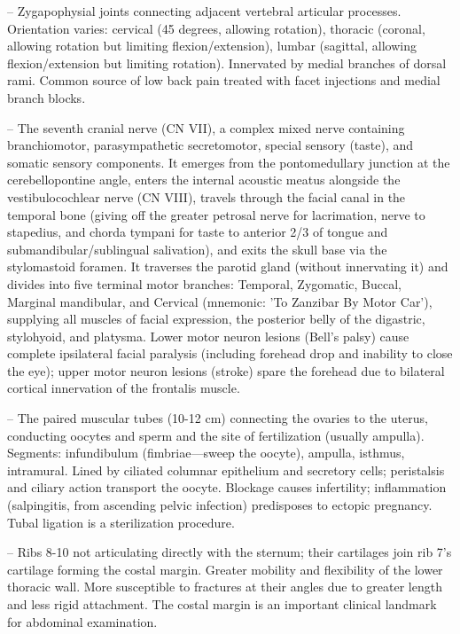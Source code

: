 -- Zygapophysial joints connecting adjacent vertebral articular processes. Orientation varies: cervical (45 degrees, allowing rotation), thoracic (coronal, allowing rotation but limiting flexion/extension), lumbar (sagittal, allowing flexion/extension but limiting rotation). Innervated by medial branches of dorsal rami. Common source of low back pain treated with facet injections and medial branch blocks.

-- The seventh cranial nerve (CN VII), a complex mixed nerve containing branchiomotor, parasympathetic secretomotor, special sensory (taste), and somatic sensory components. It emerges from the pontomedullary junction at the cerebellopontine angle, enters the internal acoustic meatus alongside the vestibulocochlear nerve (CN VIII), travels through the facial canal in the temporal bone (giving off the greater petrosal nerve for lacrimation, nerve to stapedius, and chorda tympani for taste to anterior 2/3 of tongue and submandibular/sublingual salivation), and exits the skull base via the stylomastoid foramen. It traverses the parotid gland (without innervating it) and divides into five terminal motor branches: Temporal, Zygomatic, Buccal, Marginal mandibular, and Cervical (mnemonic: 'To Zanzibar By Motor Car'), supplying all muscles of facial expression, the posterior belly of the digastric, stylohyoid, and platysma. Lower motor neuron lesions (Bell's palsy) cause complete ipsilateral facial paralysis (including forehead drop and inability to close the eye); upper motor neuron lesions (stroke) spare the forehead due to bilateral cortical innervation of the frontalis muscle.

-- The paired muscular tubes (10-12 cm) connecting the ovaries to the uterus, conducting oocytes and sperm and the site of fertilization (usually ampulla). Segments: infundibulum (fimbriae—sweep the oocyte), ampulla, isthmus, intramural. Lined by ciliated columnar epithelium and secretory cells; peristalsis and ciliary action transport the oocyte. Blockage causes infertility; inflammation (salpingitis, from ascending pelvic infection) predisposes to ectopic pregnancy. Tubal ligation is a sterilization procedure.

-- Ribs 8-10 not articulating directly with the sternum; their cartilages join rib 7's cartilage forming the costal margin. Greater mobility and flexibility of the lower thoracic wall. More susceptible to fractures at their angles due to greater length and less rigid attachment. The costal margin is an important clinical landmark for abdominal examination.

